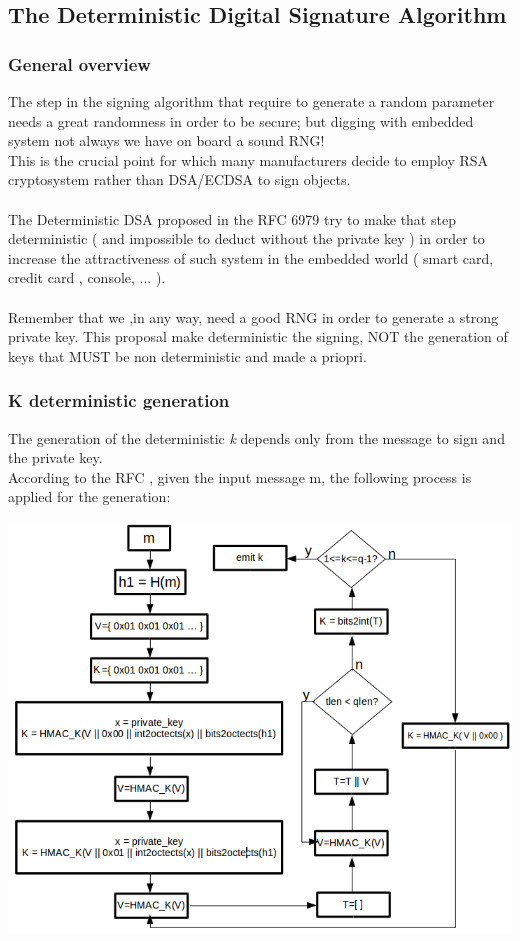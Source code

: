 \documentclass[11pt,english]{article}
\begin{document}
\subsection{The Deterministic Digital Signature Algorithm}

\subsubsection{General overview}
The step in the signing algorithm that require to generate a random parameter needs a great randomness in order to be secure; but digging with embedded system not always we have on board a sound RNG! \\This is the crucial point for which many manufacturers decide to employ RSA cryptosystem rather than DSA/ECDSA to sign objects.\\
\\The Deterministic DSA proposed in the RFC 6979 try to make that step deterministic ( and impossible to deduct without the private key ) in order to increase the attractiveness of such system in the embedded world ( smart card, credit card , console, ... ).\\\\
Remember that we ,in any way, need a good RNG in order to generate a strong private key. 
This proposal make deterministic the signing, NOT the generation of keys that MUST be non deterministic and made a priopri.


\subsubsection{K deterministic generation}

The generation of the deterministic \textit{k} depends only from the message to sign and the private key.\\
According to the RFC ,  given the input message m, the following process is applied for the generation:

\includegraphics[width=1.0\textwidth]{img/img_2.png} \\
\end{document}
